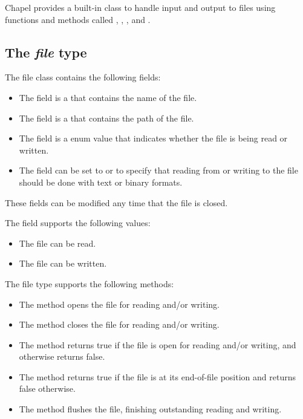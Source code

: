 \label{Input_and_Output}

Chapel provides a built-in  class to handle input and
output to files using functions and methods
called , ,
, and .

\subsection{The {\em file} type}

The file class contains the following fields:
\begin{itemize}
\item
The  field is a  that contains the name of
the file.
\item
The  field is a  that contains the path of the
file.
\item
The  field is a  enum value that indicates
whether the file is being read or written.
\item
The  field can be set to  or  to
specify that reading from or writing to the file should be done with
text or binary formats.
\end{itemize}
These fields can be modified any time that the file is closed.

The  field supports the following  values:
\begin{itemize}
\item
{} The file can be read.
\item
{} The file can be written.
\end{itemize}

The file type supports the following methods:
\begin{itemize}
\item
The  method opens the file for reading and/or writing.
\item
The  method closes the file for reading and/or writing.
\item
The  method returns true if the file is open for reading
and/or writing, and otherwise returns false.
\item
The  method returns true if the file is at its end-of-file
position and returns false otherwise.
\item
The  method flushes the file, finishing outstanding
reading and writing.
\end{itemize}

